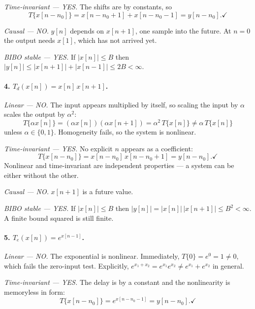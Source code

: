 \emph{Time-invariant — YES.} The shifts are by constants, so
\begin{equation}
  T\{x[n-n_0]\} = x[n-n_0+1] + x[n-n_0-1] = y[n-n_0]. \checkmark
\end{equation}

\emph{Causal — NO.} $y[n]$ depends on $x[n+1]$, one sample into the future. At
$n = 0$ the output needs $x[1]$, which has not arrived yet.

\emph{BIBO stable — YES.} If $|x[n]| \le B$ then
$|y[n]| \le |x[n+1]| + |x[n-1]| \le 2B < \infty$.

\paragraph{4. $T_d(x[n]) = x[n]\,x[n+1]$.}

\emph{Linear — NO.} The input appears multiplied by itself, so scaling the input
by $\alpha$ scales the output by $\alpha^2$:
\begin{equation}
  T\{\alpha x[n]\} = (\alpha x[n])(\alpha x[n+1]) = \alpha^2\,T\{x[n]\}
    \ne \alpha\,T\{x[n]\}
\end{equation}
unless $\alpha \in \{0,1\}$. Homogeneity fails, so the system is nonlinear.

\emph{Time-invariant — YES.} No explicit $n$ appears as a coefficient:
\begin{equation}
  T\{x[n-n_0]\} = x[n-n_0]\,x[n-n_0+1] = y[n-n_0]. \checkmark
\end{equation}
Nonlinear and time-invariant are independent properties — a system can be either
without the other.

\emph{Causal — NO.} $x[n+1]$ is a future value.

\emph{BIBO stable — YES.} If $|x[n]| \le B$ then
$|y[n]| = |x[n]|\,|x[n+1]| \le B^2 < \infty$. A finite bound squared is still
finite.

\paragraph{5. $T_e(x[n]) = e^{x[n-1]}$.}

\emph{Linear — NO.} The exponential is nonlinear. Immediately,
$T\{0\} = e^0 = 1 \ne 0$, which fails the zero-input test. Explicitly,
$e^{x_1 + x_2} = e^{x_1}e^{x_2} \ne e^{x_1} + e^{x_2}$ in general.

\emph{Time-invariant — YES.} The delay is by a constant and the nonlinearity is
memoryless in form:
\begin{equation}
  T\{x[n-n_0]\} = e^{x[n-n_0-1]} = y[n-n_0]. \checkmark
\end{equation}

